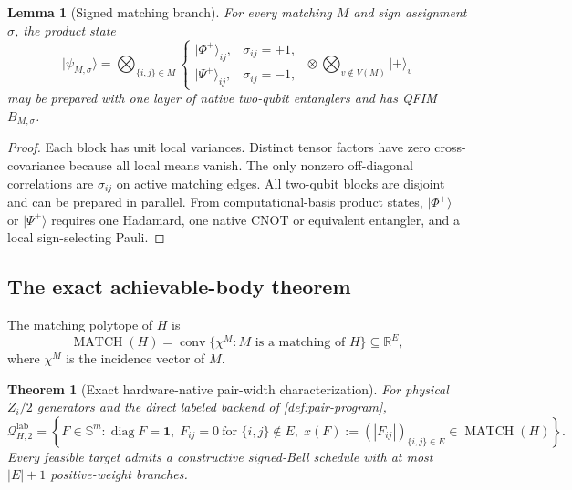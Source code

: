 \documentclass[11pt]{article}
\newtheorem{theorem}{Theorem}[section]
\newtheorem{lemma}[lemma]{Lemma}
\theoremstyle{definition}
\theoremstyle{remark}
\newcommand{\R}{\mathbb{R}}
\newcommand{\Q}{\mathcal{Q}}
\newcommand{\MATCH}{\operatorname{MATCH}}
\newcommand{\diag}{\operatorname{diag}}
\newcommand{\conv}{\operatorname{conv}}
\newcommand{\lab}{\mathrm{lab}}
\newcommand{\ket}[1]{\lvert #1\rangle}
\newcommand{\ones}{\mathbf{1}}
\begin{document}
\begin{lemma}[Signed matching branch]
\label{lem:signed-matching-branch}
For every matching $M$ and sign assignment $\sigma$, the product state
\begin{equation}
  \ket{\psi_{M,\sigma}}
  =\bigotimes_{\{i,j\}\in M}
  \begin{cases}
  \ket{\Phi^+}_{ij},&\sigma_{ij}=+1,\\
  \ket{\Psi^+}_{ij},&\sigma_{ij}=-1,
  \end{cases}
  \;\otimes\!
  \bigotimes_{v\notin V(M)}\ket{+}_v
  \label{eq:matching-state}
\end{equation}
may be prepared with one layer of native two-qubit entanglers and has QFIM $B_{M,\sigma}$.
\end{lemma}

\begin{proof}
Each block has unit local variances. Distinct tensor factors have zero cross-covariance because all local means vanish. The only nonzero off-diagonal correlations are $\sigma_{ij}$ on active matching edges. All two-qubit blocks are disjoint and can be prepared in parallel. From computational-basis product states, $\ket{\Phi^+}$ or $\ket{\Psi^+}$ requires one Hadamard, one native CNOT or equivalent entangler, and a local sign-selecting Pauli.
\end{proof}

\subsection{The exact achievable-body theorem}
The matching polytope of $H$ is
\begin{equation}
  \MATCH(H)=\conv\{\chi^M:M\text{ is a matching of }H\}\subseteq\R^{E},
  \label{eq:matching-polytope-def}
\end{equation}
where $\chi^M$ is the incidence vector of $M$.

\begin{theorem}[Exact hardware-native pair-width characterization]
\label{thm:matching-characterization}
For physical $Z_i/2$ generators and the direct labeled backend of \cref{def:pair-program},
\begin{equation}
\boxed{
  \Q^{\lab}_{H,2}
  =\left\{
  F\in\mathbb S^m:
  \diag F=\ones,\;
  F_{ij}=0\ \text{for }\{i,j\}\notin E,\;
  x(F):=(|F_{ij}|)_{\{i,j\}\in E}\in\MATCH(H)
  \right\}.}
  \label{eq:main-matching-theorem}
\end{equation}
Every feasible target admits a constructive signed-Bell schedule with at most $|E|+1$ positive-weight branches.
\end{theorem}
\end{document}
